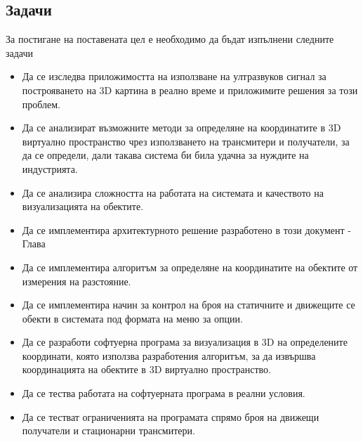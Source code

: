 \subsection{Задачи}
За постигане на поставената цел е необходимо да бъдат изпълнени следните задачи
\begin{itemize}
    \item Да се изследва приложимостта на използване на ултразвуков сигнал за построяването на 3D картина в реално време и приложимите решения за този проблем.
      
    \item Да се анализират възможните методи за определяне на координатите в 3D виртуално пространство чрез използването на трансмитери и получатели, за да се определи, дали такава система би била удачна за нуждите на индустрията.
    
    \item Да се анализира сложността на работата на системата и качеството на визуализацията на обектите.
    
    \item Да се имплементира архитектурното решение разработено в този документ - Глава 
    
    \item Да се имплементира алгоритъм за определяне на координатите на обектите от измерения на разстояние.
    
    \item Да се имплементира начин за контрол на броя на статичните и движещите се обекти в системата под формата на меню за опции.
    
    \item Да се разработи софтуерна програма за визуализация в 3D на определените координати, която използва разработения алгоритъм, за да извършва координацията на обектите в 3D виртуално пространство.
    
    \item Да се тества работата на софтуерната програма в реални условия.
    
    \item Да се тестват ограниченията на програмата спрямо броя на движещи получатели и стационарни трансмитери.
\end{itemize}